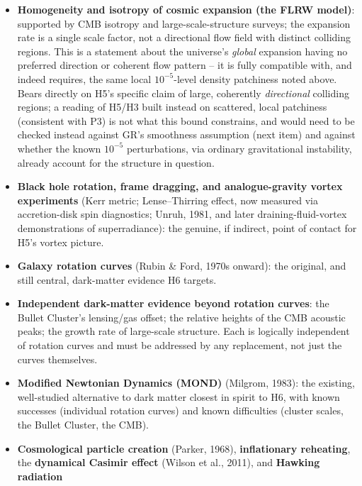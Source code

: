 \documentclass[12pt, a4paper]{article}
\begin{document}
\begin{itemize}
    legitimate research programs nearest in spirit to H3/H4's
    ``inconsistencies in space,'' discussed below.
  \item \textbf{Homogeneity and isotropy of cosmic expansion (the FLRW
    model)}: supported by CMB isotropy and large-scale-structure
    surveys; the expansion rate is a single scale factor, not a
    directional flow field with distinct colliding regions. This is a
    statement about the universe's \emph{global} expansion having no
    preferred direction or coherent flow pattern -- it is fully
    compatible with, and indeed requires, the same local $10^{-5}$-level
    density patchiness noted above. Bears directly on H5's specific
    claim of large, coherently \emph{directional} colliding regions; a
    reading of H5/H3 built instead on scattered, local patchiness
    (consistent with P3) is not what this bound constrains, and would
    need to be checked instead against GR's smoothness assumption
    (next item) and against whether the known $10^{-5}$ perturbations,
    via ordinary gravitational instability, already account for the
    structure in question.
  \item \textbf{Black hole rotation, frame dragging, and
    analogue-gravity vortex experiments} (Kerr metric; Lense--Thirring
    effect, now measured via accretion-disk spin diagnostics; Unruh,
    1981, and later draining-fluid-vortex demonstrations of
    superradiance): the genuine, if indirect, point of contact for
    H5's vortex picture.
  \item \textbf{Galaxy rotation curves} (Rubin \& Ford, 1970s onward):
    the original, and still central, dark-matter evidence H6 targets.
  \item \textbf{Independent dark-matter evidence beyond rotation
    curves}: the Bullet Cluster's lensing/gas offset; the relative
    heights of the CMB acoustic peaks; the growth rate of large-scale
    structure. Each is logically independent of rotation curves and
    must be addressed by any replacement, not just the curves
    themselves.
  \item \textbf{Modified Newtonian Dynamics (MOND)} (Milgrom, 1983):
    the existing, well-studied alternative to dark matter closest in
    spirit to H6, with known successes (individual rotation curves)
    and known difficulties (cluster scales, the Bullet Cluster, the
    CMB).
  \item \textbf{Cosmological particle creation} (Parker, 1968),
    \textbf{inflationary reheating}, the \textbf{dynamical Casimir
    effect} (Wilson et al., 2011), and \textbf{Hawking radiation}

\end{itemize}
\end{document}
